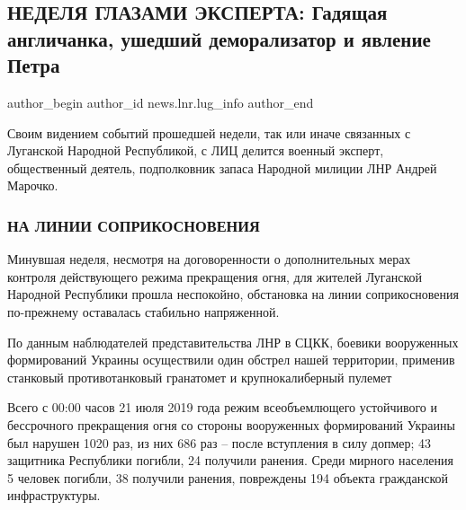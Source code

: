  
 
 
 
 
 
\subsection{НЕДЕЛЯ ГЛАЗАМИ ЭКСПЕРТА: Гадящая англичанка, ушедший деморализатор и явление Петра}
\label{sec:23_01_2022.stz.news.lnr.lug_info.2.javlenie_petra}
 
\ifcmt
 author_begin
   author_id news.lnr.lug_info
 author_end
\fi

\begin{zznagolos}
Своим видением событий прошедшей недели, так или иначе связанных с Луганской
Народной Республикой, с ЛИЦ делится военный эксперт, общественный деятель,
подполковник запаса Народной милиции ЛНР Андрей Марочко.	
\end{zznagolos}


\subsubsection{НА ЛИНИИ СОПРИКОСНОВЕНИЯ}

Минувшая неделя, несмотря на договоренности о дополнительных мерах контроля
действующего режима прекращения огня, для жителей Луганской Народной Республики
прошла неспокойно, обстановка на линии соприкосновения по-прежнему оставалась
стабильно напряженной.

По данным наблюдателей представительства ЛНР в СЦКК, боевики вооруженных
формирований Украины осуществили один обстрел нашей территории, применив
станковый противотанковый гранатомет и крупнокалиберный пулемет

Всего с 00:00 часов 21 июля 2019 года режим всеобъемлющего устойчивого и
бессрочного прекращения огня со стороны вооруженных формирований Украины был
нарушен 1020 раз, из них 686 раз – после вступления в силу допмер; 43 защитника
Республики погибли, 24 получили ранения. Среди мирного населения 5 человек
погибли, 38 получили ранения, повреждены 194 объекта гражданской
инфраструктуры.


